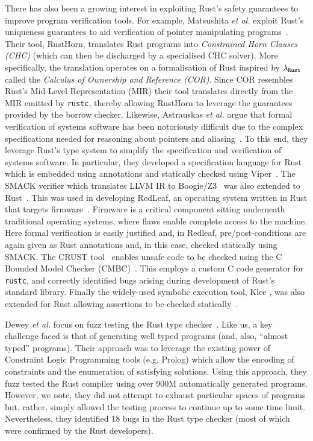 There has also been a growing interest in exploiting Rust's safety
guarantees to improve program verification tools.  For example,
Matsushita {\em et al.}  exploit Rust's uniqueness guarantees to aid
verification of pointer manipulating programs~\cite{MTK20}.  Their
tool, RustHorn, translates Rust programs into {\em Constrained Horn
  Clauses (CHC)} (which can then be discharged by a specialised CHC
solver).  More specifically, the translation operates on a
formalisation of Rust inspired by ${\tt\lambda_{Rust}}$ called the
{\em Calculus of Ownership and Reference (COR)}.  Since COR resembles
Rust's Mid-Level Representation (MIR) their tool translates directly
from the MIR emitted by \lstinline{rustc}, thereby allowing RustHorn
to leverage the guarantees provided by the borrow checker.  Likewise,
Astrauskas {\em et al.} argue that formal verification of systems
software has been notoriously difficult due to the complex
specifications needed for reasoning about pointers and
aliasing~\cite{AMPS19}.  To this end, they leverage Rust's type system
to simplify the specification and verification of systems software.
In particular, they developed a specification language for Rust which
is embedded using annotations and statically checked using
Viper~\cite{MSS16}.  The SMACK verifier which translates LLVM IR to
Boogie/Z3~\cite{BCDJL06,MB08} was also extended to Rust~\cite{BHR18}.
This was used in developing RedLeaf, an operating system written in
Rust that targets firmware~\cite{NBRRB19}.  Firmware is a critical
component sitting underneath traditional operating systems, where
flaws enable complete access to the machine.  Here formal verification
is easily justified and, in Redleaf, pre/post-conditions are again
given as Rust annotations and, in this case, checked statically using
SMACK.  The {\scshape CRUST} tool~\cite{TPT15} enables unsafe code to
be checked using the C Bounded Model Checker (CMBC)~\cite{KT14}.  This
employs a custom C code generator for \lstinline{rustc}, and
correctly identified bugs arising during development of Rust's
standard library.  Finally the widely-used symbolic execution tool,
Klee \cite{CDE08}, was also extended for Rust allowing assertions to
be checked statically~\cite{LAL18,LFEL19}.

Dewey {\em et al.} focus on fuzz testing the Rust type
checker~\cite{DRH15}.  Like us, a key challenge faced is that of
generating well typed programs (and, also, ``almost typed'' programs).
Their approach was to leverage the existing power of Constraint Logic
Programming tools (e.g. Prolog) which allow the encoding of
constraints and the enumeration of satisfying solutions.  Using this
approach, they fuzz tested the Rust compiler using over 900M
automatically generated programs.  However, we note, they did not
attempt to exhaust particular spaces of programs but, rather, simply
allowed the testing process to continue up to some time limit.
Nevertheless, they identified 18 bugs in the Rust type checker (most
of which were confirmed by the Rust developers).

